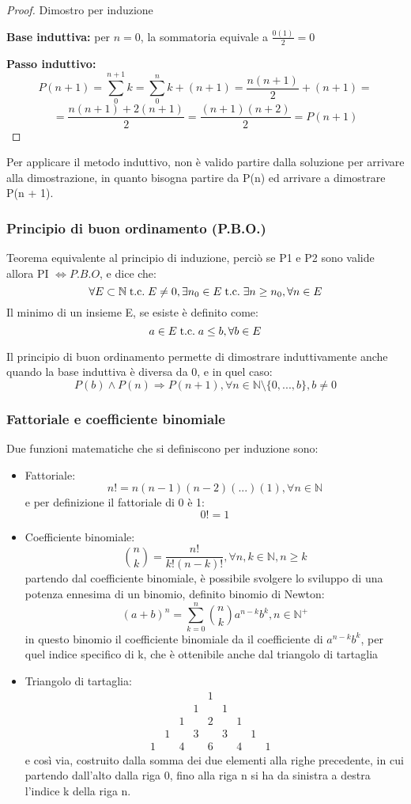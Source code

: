 \documentclass[a4paper,12pt]{article}
\begin{document}
	\begin{proof}
		Dimostro per induzione
		
		\textbf{Base induttiva:} per \(n = 0\), la sommatoria equivale a \(\frac{0(1)}{2} = 0\)
		
		\textbf{Passo induttivo:} 
		\[P(n + 1) = \sum_{0}^{n + 1} k = \sum_{0}^{n} k + (n + 1) = \frac{n(n+1)}{2} + (n + 1) =\]
		\[= \frac{n(n+1) + 2(n+1)}{2} = \frac{(n+1)(n + 2)}{2} = P(n + 1)\] 
	\end{proof}
	
	Per applicare il metodo induttivo, non è valido partire dalla soluzione per arrivare alla dimostrazione, in quanto bisogna partire da P(n) ed arrivare a dimostrare P(n + 1).
	
	\subsubsection{Principio di buon ordinamento (P.B.O.)}
	Teorema equivalente al principio di induzione, perciò se P1 e P2 sono valide allora PI $\iff P.B.O$, e dice che:
	\[\forall E \subset \mathbb{N} \;\text{t.c.}\; E \not = 0, \exists n_0 \in E \;\text{t.c.}\; \exists n \geq n_0, \forall n \in E\]
	Il minimo di un insieme E, se esiste è definito come:
	\[a\in E \;\text{t.c.}\; a \leq b, \forall b \in E\]
	
	Il principio di buon ordinamento permette di dimostrare induttivamente anche quando la base induttiva è diversa da 0, e in quel caso:
	\[P(b) \wedge P(n) \Rightarrow P(n + 1), \forall n \in \mathbb{N}\setminus \{0, ... ,b\}, b \not = 0\]
	
	\subsubsection{Fattoriale e coefficiente binomiale}
	Due funzioni matematiche che si definiscono per induzione sono:
	\begin{itemize}
		\item Fattoriale:
		\[n! = n(n-1)(n-2)(...)(1), \forall n \in \mathbb{N}\]
		e per definizione il fattoriale di 0 è 1:
		\[0! = 1\]
		\item Coefficiente binomiale:
		\[\binom{n}{k} = \frac{n!}{k!(n-k)!}, \forall n,k \in \mathbb{N}, n \geq k\]
		partendo dal coefficiente binomiale, è possibile svolgere lo sviluppo di una potenza ennesima di un binomio, definito binomio di Newton:
		\[(a+b)^n = \sum_{k = 0}^{n} \binom{n}{k} a^{n-k}b^k, n\in \mathbb{N}^+\]
		in questo binomio il coefficiente binomiale da il coefficiente di $a^{n-k}b^k$, per quel indice specifico di k, che è ottenibile anche dal triangolo di tartaglia
		\item Triangolo di tartaglia:
		\[
		\begin{array}{ccccccccccc}
			&&&&1&&&\\
			&&&1&&1&&\\
			&&1&&2&&1&\\
			&1&&3&&3&&1\\
			1&&4&&6&&4&&1&
		\end{array}
		\]
		e così via, costruito dalla somma dei due elementi alla righe precedente, in cui partendo dall'alto dalla riga 0, fino alla riga n si ha da sinistra a destra l'indice k della riga n.
	\end{itemize}
	
\end{document}
